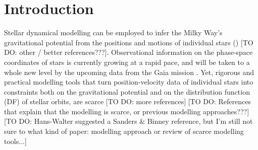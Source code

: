 \section{Introduction} \label{sec:intro}

Stellar dynamical modelling can be employed to infer the Milky Way's gravitational potential from the positions and motions of individual stars (\citealt{bin08,bin11b,rix13}) [TO DO: other / better references???]. Observational information on the phase-space coordinates of stars is currently growing at a rapid pace, and will be taken to a whole new level by the upcoming data from the Gaia mission \citep{2001A&A...369..339P}. Yet, rigorous and practical modelling tools that turn position-velocity data of individual stars into constraints both on the gravitational potential and on the distribution function (DF) of stellar orbits, are scarce \citep{rix13} [TO DO: more references] [TO DO: References that explain that the modelling is scarce, or previous modelling approaches???] [TO DO: Hans-Walter suggested a Sanders \& Binney reference, but I'm still not sure to what kind of paper: modelling approach or review of scarce modelling tools...]







